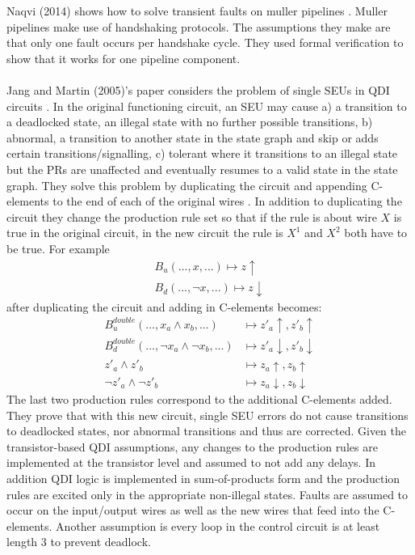 \documentclass[12pt]{report}
\begin{document}
Naqvi (2014) shows how to solve transient faults on muller pipelines \cite{Naqvi_mullerpipeline}.  Muller pipelines make use of handshaking protocols.  The assumptions they make are that only one fault occurs per handshake cycle.  They used formal verification to show that it works for one pipeline component. \\
\\
Jang and Martin (2005)’s paper considers the problem of single SEUs in QDI circuits \cite{JangMartin_SEUQDI}.  In the original functioning circuit, an SEU may cause a) a transition to a deadlocked state, an illegal state with no further possible transitions, b) abnormal, a transition to another state in the state graph and skip or adds certain transitions/signalling, c) tolerant where it transitions to an illegal state but the PRs are unaffected and eventually resumes to a valid state in the state graph.  They solve this problem by duplicating the circuit and appending C-elements to the end of each of the original wires .  In addition to duplicating the circuit they change the production rule set so that if the rule is about wire $X$ is true in the original circuit, in the new circuit the rule is $X^1$ and $X^2$ both have to be true.  For example
\begin{align*}
   B_u (...,x,...)\mapsto z\uparrow \\
   B_d (...,\lnot x,...)\mapsto z\downarrow
\end{align*}
after duplicating the circuit and adding in C-elements becomes:
\begin{align*}
   B_u^{double} (...,x_a\wedge x_b,...) & \mapsto z'_a\uparrow, z'_b\uparrow\\
   B_d^{double} (...,\lnot x_a\wedge \lnot x_b,...) & \mapsto z'_a\downarrow, z'_b\downarrow\\
   z'_a \wedge z'_b& \mapsto z_a\uparrow, z_b\uparrow\\
   \lnot z'_a\wedge \lnot z'_b& \mapsto z_a\downarrow, z_b\downarrow
\end{align*}
The last two production rules correspond to the additional C-elements added.  
They prove that with this new circuit, single SEU errors do not cause transitions to deadlocked states, nor abnormal transitions and thus are corrected.  Given the transistor-based QDI assumptions, any changes to the production rules are implemented at the transistor level and assumed to not add any delays.  In addition QDI logic is implemented in sum-of-products form and the production rules are excited only in the appropriate non-illegal states.  Faults are assumed to occur on the input/output wires as well as the new wires that feed into the C-elements.  Another assumption is every loop in the control circuit is at least length 3 to prevent deadlock. %
\\
\end{document}
